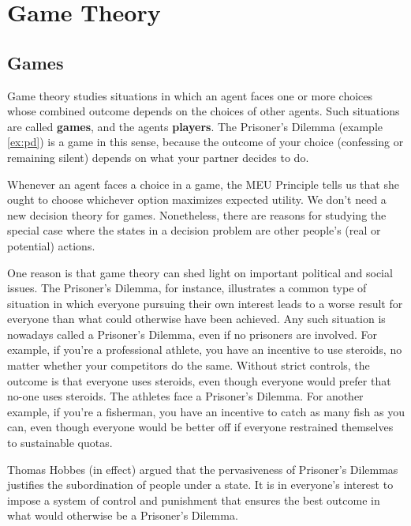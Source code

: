\chapter{Game Theory}\label{ch:gametheory}

\section{Games}\label{sec:games}

Game theory studies situations in which an agent faces one or more
choices whose combined outcome depends on the choices of other agents.
Such situations are called \textbf{games}, and the agents
\textbf{players}. The Prisoner's Dilemma (example \ref{ex:pd}) is a game
in this sense, because the outcome of your choice (confessing or
remaining silent) depends on what your partner decides to do.

Whenever an agent faces a choice in a game, the MEU Principle tells us
that she ought to choose whichever option maximizes expected
utility. We don't need a new decision theory for
games. Nonetheless, there are reasons for studying the special case
where the states in a decision problem are other people's (real or
potential) actions.

One reason is that game theory can shed light on important political
and social issues. The Prisoner's Dilemma, for instance, illustrates a
common type of situation in which everyone pursuing their own interest
leads to a worse result for everyone than what could otherwise have been
achieved. Any such situation is nowadays called a Prisoner's Dilemma,
even if no prisoners are involved. For example, if you're a
professional athlete, you have an incentive to use steroids, no matter
whether your competitors do the same. Without strict controls, the
outcome is that everyone uses steroids, even though everyone would
prefer that no-one uses steroids. The athletes face a Prisoner's
Dilemma. For another example, if you're a fisherman, you have an
incentive to catch as many fish as you can, even though everyone would
be better off if everyone restrained themselves to sustainable quotas.

Thomas Hobbes (in effect) argued that the pervasiveness of Prisoner's
Dilemmas justifies the subordination of people under a state. It is in
everyone's interest to impose a system of control and punishment that
ensures the best outcome in what would otherwise be a Prisoner's
Dilemma.


